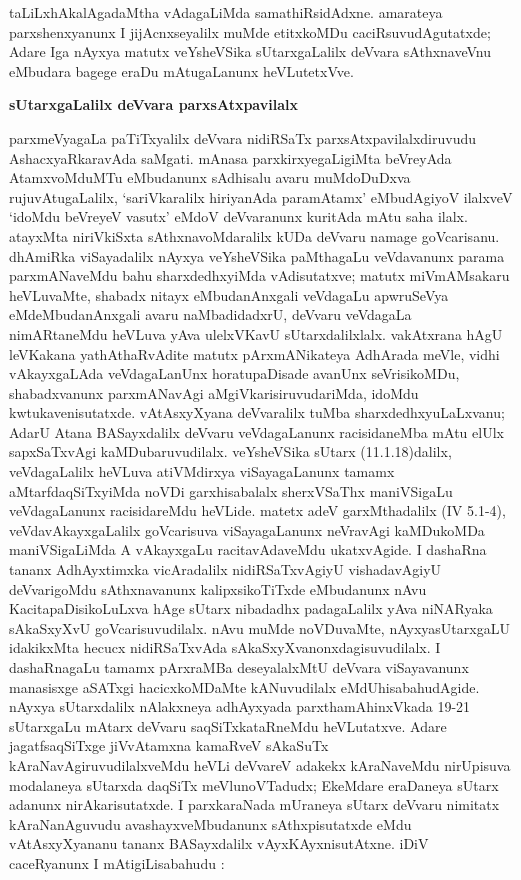 taLiLxhAkalAgadaMtha vAdagaLiMda samathiRsidAdxne. amarateya parxshenxyanunx I jijAcnxseyalilx muMde etitxkoMDu caciRsuvudAgutatxde; Adare Iga nAyxya matutx veYsheVSika sUtarxgaLalilx deVvara sAthxnaveVnu eMbudara bagege eraDu mAtugaLanunx heVLutetxVve.

\bigskip
\begin{center}
{\Large\bf sUtarxgaLalilx deVvara parxsAtxpavilalx}
\end{center}

parxmeVyagaLa paTiTxyalilx deVvara nidiRSaTx parxsAtxpavilalxdiruvudu AshacxyaRkaravAda saMgati. mAnasa parxkirxyegaLigiMta beVreyAda AtamxvoMduMTu eMbudanunx sAdhisalu avaru muMdoDuDxva rujuvAtugaLalilx, `sariVkaralilx hiriyanAda paramAtamx' eMbudAgiyoV ilalxveV `idoMdu beVreyeV vasutx' eMdoV deVvaranunx kuritAda mAtu saha ilalx. atayxMta niriVkiSxta sAthxnavoMdaralilx kUDa deVvaru namage goVcarisanu. dhAmiRka viSayadalilx nAyxya veYsheVSika paMthagaLu veVdavanunx parama parxmANaveMdu bahu sharxdedhxyiMda vAdisutatxve; matutx miVmAMsakaru heVLuvaMte, shabadx nitayx eMbudanAnxgali veVdagaLu apwruSeVya eMdeMbudanAnxgali avaru naMbadidadxrU, deVvaru veVdagaLa nimARtaneMdu heVLuva yAva ulelxVKavU sUtarxdalilxlalx. vakAtxrana hAgU leVKakana yathAthaRvAdite matutx pArxmANikateya AdhArada meVle, vidhi vAkayxgaLAda veVdagaLanUnx horatupaDisade avanUnx seVrisikoMDu, shabadxvanunx parxmANavAgi aMgiVkarisiruvudariMda, idoMdu kwtukavenisutatxde. vAtAsxyXyana deVvaralilx tuMba sharxdedhxyuLaLxvanu; AdarU Atana BASayxdalilx deVvaru veVdagaLanunx racisidaneMba mAtu elUlx sapxSaTxvAgi kaMDubaruvudilalx. veYsheVSika sUtarx {\rm(11.1.18)}dalilx, veVdagaLalilx heVLuva atiVMdirxya viSayagaLanunx tamamx aMtarfdaqSiTxyiMda noVDi garxhisabalalx sherxVSaThx maniVSigaLu veVdagaLanunx racisidareMdu heVLide. matetx adeV garxMthadalilx {\rm(IV 5.1-4)}, veVdavAkayxgaLalilx goVcarisuva viSayagaLanunx neVravAgi kaMDukoMDa maniVSigaLiMda A vAkayxgaLu racitavAdaveMdu ukatxvAgide. I dashaRna tananx AdhAyxtimxka vicAradalilx nidiRSaTxvAgiyU vishadavAgiyU deVvarigoMdu sAthxnavanunx kalipxsikoTiTxde eMbudanunx nAvu KacitapaDisikoLuLxva hAge sUtarx nibadadhx padagaLalilx yAva niNARyaka sAkaSxyXvU goVcarisuvudilalx. nAvu muMde noVDuvaMte, nAyxyasUtarxgaLU idakikxMta hecucx nidiRSaTxvAda sAkaSxyXvanonxdagisuvudilalx. I dashaRnagaLu tamamx pArxraMBa deseyalalxMtU deVvara viSayavanunx manasisxge aSATxgi hacicxkoMDaMte kANuvudilalx eMdUhisabahudAgide. nAyxya sUtarxdalilx nAlakxneya adhAyxyada parxthamAhinxVkada {\rm 19-21} sUtarxgaLu mAtarx deVvaru saqSiTxkataRneMdu heVLutatxve. Adare jagatfsaqSiTxge jiVvAtamxna kamaRveV sAkaSuTx kAraNavAgiruvudilalxveMdu heVLi deVvareV adakekx kAraNaveMdu nirUpisuva modalaneya sUtarxda daqSiTx meVlunoVTadudx; EkeMdare eraDaneya sUtarx adanunx nirAkarisutatxde. I parxkaraNada mUraneya sUtarx deVvaru nimitatx kAraNanAguvudu avashayxveMbudanunx sAthxpisutatxde eMdu vAtAsxyXyananu tananx BASayxdalilx vAyxKAyxnisutAtxne. iDiV caceRyanunx I mAtigiLisabahudu : 